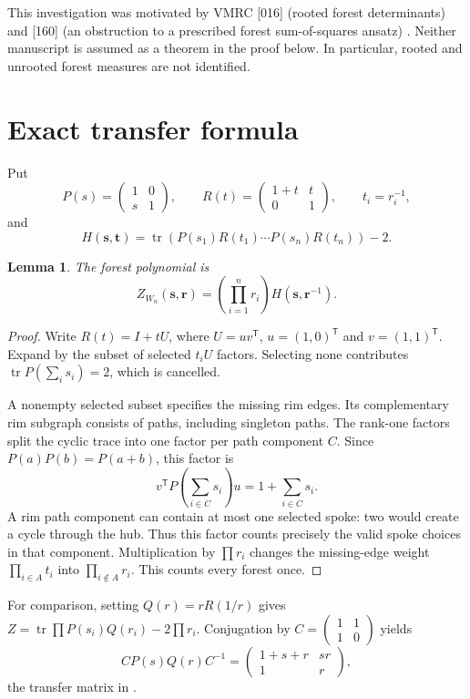 \documentclass[11pt]{article}
\newtheorem{lemma}[theorem]{Lemma}
\newcommand{\tr}{\operatorname{tr}}
\begin{document}
This investigation was motivated by VMRC [016] (rooted forest determinants) and [160] (an obstruction to a prescribed forest sum-of-squares ansatz) \cite{VMRC}. Neither manuscript is assumed as a theorem in the proof below. In particular, rooted and unrooted forest measures are not identified.

\section{Exact transfer formula}
Put
\[
 P(s)=\begin{pmatrix}1&0\\s&1\end{pmatrix},\qquad
 R(t)=\begin{pmatrix}1+t&t\\0&1\end{pmatrix},\qquad t_i=r_i^{-1},
\]
and
\[
 H(\boldsymbol s,\boldsymbol t)=\tr\!\left(P(s_1)R(t_1)\cdots P(s_n)R(t_n)\right)-2.
\]
\begin{lemma}\label{lem:transfer}
The forest polynomial is
\begin{equation}\label{eq:transfer}
 Z_{W_n}(\boldsymbol s,\boldsymbol r)=\left(\prod_{i=1}^n r_i\right)
 H(\boldsymbol s,\boldsymbol r^{-1}).
\end{equation}
\end{lemma}
\begin{proof}
Write $R(t)=I+tU$, where $U=uv^{\mathsf T}$, $u=(1,0)^{\mathsf T}$ and $v=(1,1)^{\mathsf T}$. Expand by the subset of selected $t_iU$ factors. Selecting none contributes $\tr P(\sum_i s_i)=2$, which is cancelled.

A nonempty selected subset specifies the missing rim edges. Its complementary rim subgraph consists of paths, including singleton paths. The rank-one factors split the cyclic trace into one factor per path component $C$. Since $P(a)P(b)=P(a+b)$, this factor is
\[
 v^{\mathsf T}P\!\left(\sum_{i\in C}s_i\right)u=1+\sum_{i\in C}s_i.
\]
A rim path component can contain at most one selected spoke: two would create a cycle through the hub. Thus this factor counts precisely the valid spoke choices in that component. Multiplication by $\prod r_i$ changes the missing-edge weight $\prod_{i\in A}t_i$ into $\prod_{i\notin A}r_i$. This counts every forest once.
\end{proof}

For comparison, setting $Q(r)=rR(1/r)$ gives $Z=\tr\prod P(s_i)Q(r_i)-2\prod r_i$. Conjugation by $C=\left(\begin{smallmatrix}1&1\\1&0\end{smallmatrix}\right)$ yields
\[
 CP(s)Q(r)C^{-1}=\begin{pmatrix}1+s+r&sr\\1&r\end{pmatrix},
\]
the transfer matrix in \cite{Bado}.
\end{document}
